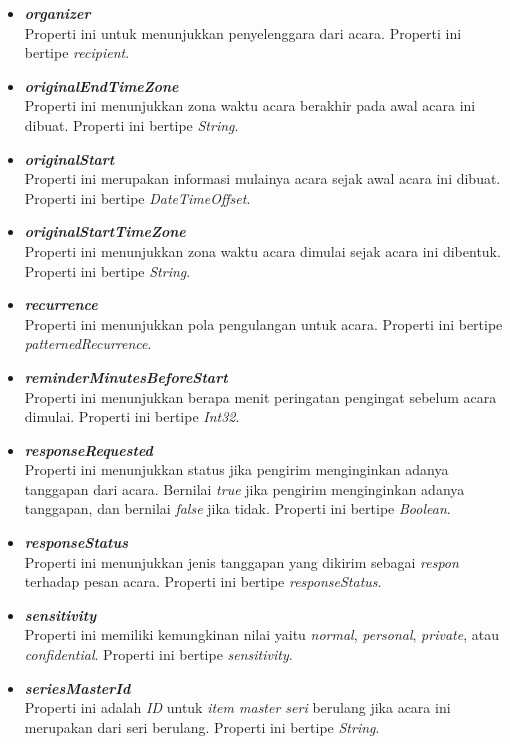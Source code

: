 \begin{itemize}
	\item \textbf{\textit{organizer}}\\
	Properti ini untuk menunjukkan penyelenggara dari acara. Properti ini bertipe \textit{recipient}. 
	\item \textbf{\textit{originalEndTimeZone}}\\
	Properti ini menunjukkan zona waktu acara berakhir pada awal acara ini dibuat. Properti ini bertipe \textit{String}. 
	\item \textbf{\textit{originalStart}}\\
	Properti ini merupakan informasi mulainya acara sejak awal acara ini dibuat. Properti ini bertipe \textit{DateTimeOffset}.  
	\item \textbf{\textit{originalStartTimeZone}}\\
	Properti ini menunjukkan zona waktu acara dimulai sejak acara ini dibentuk. Properti ini bertipe \textit{String}. 
	\item \textbf{\textit{recurrence}}\\
	Properti ini menunjukkan pola pengulangan untuk acara. Properti ini bertipe \textit{patternedRecurrence}. 
	\item \textbf{\textit{reminderMinutesBeforeStart}}\\
	Properti ini menunjukkan berapa menit peringatan pengingat sebelum acara dimulai. Properti ini bertipe \textit{Int32}. 
	\item \textbf{\textit{responseRequested}}\\
	Properti ini menunjukkan status jika pengirim menginginkan adanya tanggapan dari acara. Bernilai \textit{true} jika pengirim menginginkan adanya tanggapan, dan bernilai \textit{false} jika tidak. Properti ini bertipe \textit{Boolean}. 
	\item \textbf{\textit{responseStatus}}\\
	Properti ini menunjukkan jenis tanggapan yang dikirim sebagai \textit{respon} terhadap pesan acara. Properti ini bertipe \textit{responseStatus}. 
	\item \textbf{\textit{sensitivity}}\\
	Properti ini memiliki kemungkinan nilai yaitu \textit{normal}, \textit{personal}, \textit{private}, atau \textit{confidential}. Properti ini bertipe \textit{sensitivity}. 
	\item \textbf{\textit{seriesMasterId}}\\
	Properti ini adalah \textit{ID} untuk \textit{item master seri} berulang jika acara ini merupakan dari seri berulang. Properti ini bertipe \textit{String}.  

\end{itemize}
